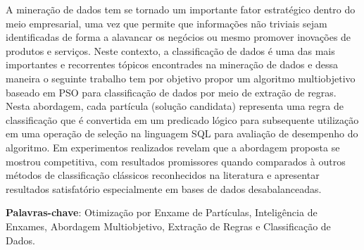 \begin{resumo}
A mineração de dados tem se tornado um importante fator estratégico dentro do meio empresarial, uma vez que permite que informações não triviais sejam identificadas de forma a alavancar os negócios ou mesmo promover inovações de produtos e serviços. Neste contexto, a classificação de dados é uma das mais importantes e recorrentes tópicos encontrades na mineração de dados e dessa maneira o seguinte trabalho tem por objetivo propor um algoritmo multiobjetivo baseado em PSO para classificação de dados por meio de extração de regras. Nesta abordagem, cada partícula (solução candidata) representa uma regra de classificação que é convertida em um predicado lógico para subsequente utilização em uma operação de seleção na linguagem SQL para avaliação de desempenho do algoritmo. Em experimentos realizados revelam que a abordagem proposta se mostrou competitiva, com resultados promissores quando comparados à outros métodos de classificação clássicos reconhecidos na literatura e apresentar resultados satisfatório especialmente em bases de dados desabalanceadas. 

\vspace{1.5ex}

\noindent \textbf{Palavras-chave}: Otimização por Enxame de Partículas, Inteligência de Enxames, Abordagem Multiobjetivo, Extração de Regras e Classificação de Dados. 
\end{resumo}
